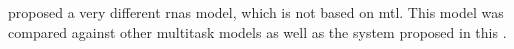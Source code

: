 
\textcite{mcleod2021modular} proposed a very different
\glspl{rna} model, which is not based on \gls{mtl}. This
model was compared against other multitask models as well as
the system proposed in this \thesisdiss{}.
